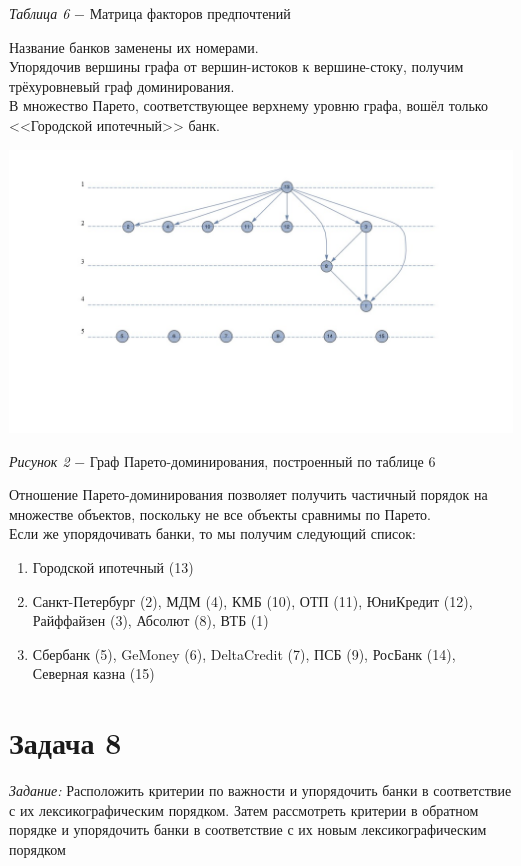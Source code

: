 \documentclass[14pt,fleqn]{extarticle}
\begin{document}
	\begin{center}
		\textit{Таблица 6} $-$ Матрица факторов предпочтений
	\end{center}
	Название  банков заменены их номерами.\\
	Упорядочив вершины графа от вершин-истоков к вершине-стоку, получим трёхуровневый граф доминирования.\\
	В множество Парето, соответствующее верхнему уровню графа, вошёл только <<Городской ипотечный>> банк.
	\begin{center}
		\includegraphics[scale=0.48]{6}
	\end{center}
	\begin{center}
		\textit{Рисунок 2} $-$ Граф Парето-доминирования, построенный по таблице 6
	\end{center}
	\newpage
	Отношение Парето-доминирования позволяет получить частичный порядок на множестве объектов, поскольку не все объекты сравнимы по Парето.\\
	
	Если же упорядочивать банки, то мы получим следующий список:
	\begin{enumerate}[nolistsep]
		\item Городской ипотечный (13)
		\item Санкт-Петербург (2), МДМ (4), КМБ (10), ОТП (11), ЮниКредит (12), Райффайзен (3), Абсолют (8), ВТБ (1)
		\item Сбербанк (5), GeMoney (6), DeltaCredit (7), ПСБ (9), РосБанк (14), Северная казна (15)
	\end{enumerate}
	\newpage
	\section*{Задача 8}
	\textit{Задание:} Расположить критерии по важности и упорядочить банки в соответствие с их лексикографическим порядком. Затем рассмотреть критерии в обратном порядке и упорядочить банки в соответствие с их новым лексикографическим порядком\\
	
\end{document}
